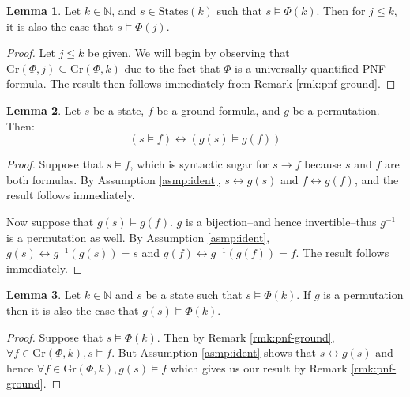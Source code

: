 \documentclass[12pt]{article}
\theoremstyle{definition}
\newtheorem{lemma}{Lemma}
\theoremstyle{remark}
\newcommand{\states}{\text{States}}
\newcommand{\gr}{\text{Gr}}
\begin{document}
\begin{lemma}
  \label{lem:lt-sat}
  Let $k \in \mathbb{N}$, and $s \in \states(k)$ such that $s \models \Phi(k)$.  Then for $j \leq k$, it is also the case that $s \models \Phi(j)$.
\end{lemma}
\begin{proof}
  Let $j \leq k$ be given.  We will begin by observing that $\gr(\Phi,j) \subseteq \gr(\Phi,k)$ due to the fact that $\Phi$ is a universally quantified PNF formula.  The result then follows immediately from Remark \ref{rmk:pnf-ground}.
\end{proof}

\begin{lemma}
  \label{lem:state-sat-perm}
  Let $s$ be a state, $f$ be a ground formula, and $g$ be a permutation.  Then:
  $$(s \models f) \leftrightarrow (g(s) \models g(f))$$
\end{lemma}
\begin{proof}
  Suppose that $s \models f$, which is syntactic sugar for $s \rightarrow f$ because $s$ and $f$ are both formulas.  By Assumption \ref{asmp:ident}, $s \leftrightarrow g(s)$ and $f \leftrightarrow g(f)$, and the result follows immediately.

  Now suppose that $g(s) \models g(f)$.  $g$ is a bijection--and hence invertible--thus $g^{-1}$ is a permutation as well.  By Assumption \ref{asmp:ident}, $g(s) \leftrightarrow g^{-1}(g(s)) = s$ and $g(f) \leftrightarrow g^{-1}(g(f)) = f$.  The result follows immediately.
\end{proof}

\begin{lemma}
  \label{lem:state-perm}
  Let $k \in \mathbb{N}$ and $s$ be a state such that $s \models \Phi(k)$.  If $g$ is a permutation then it is also the case that $g(s) \models \Phi(k)$.
\end{lemma}
\begin{proof}
  Suppose that $s \models \Phi(k)$.  Then by Remark \ref{rmk:pnf-ground}, $\forall f \in \gr(\Phi,k), s \models f$.  But Assumption \ref{asmp:ident} shows that $s \leftrightarrow g(s)$ and hence $\forall f \in \gr(\Phi,k), g(s) \models f$ which gives us our result by Remark \ref{rmk:pnf-ground}.
\end{proof}
\end{document}
